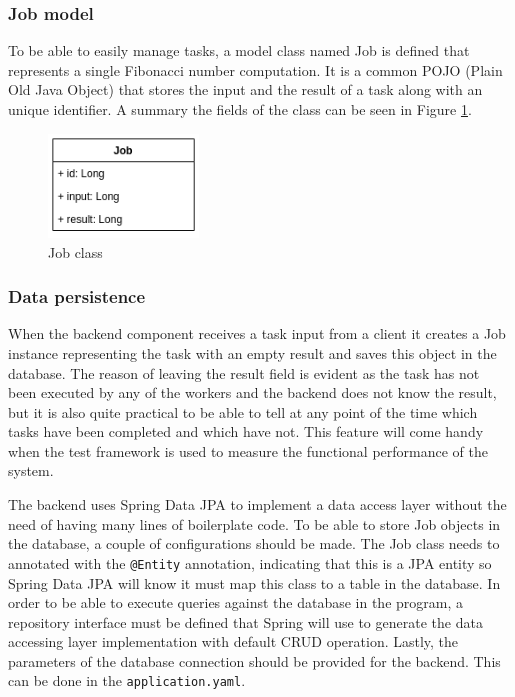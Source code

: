 \subsubsection{Job model}


To be able to easily manage tasks, a model class named Job is defined that represents a single Fibonacci number computation. It is a common POJO (Plain Old Java Object) that stores the input and the result of a task along with an unique identifier. A summary the fields of the class can be seen in Figure \ref{fig:job_model}.

\begin{figure}[h]
	\centering
	\includegraphics[width=40mm, keepaspectratio]{figures/job_class.png}
	\caption{Job class}
	\label{fig:job_model}
\end{figure}

\subsubsection{Data persistence}

When the backend component receives a task input from a client it creates a Job instance representing the task with an empty result and saves this object in the database. The reason of leaving the result field is evident as the task has not been executed by any of the workers and the backend does not know the result, but it is also quite practical to be able to tell at any point of the time which tasks have been completed and which have not. This feature will come handy when the test framework is used to measure the functional performance of the system.

The backend uses Spring Data JPA \cite{SpringDataJPA} to implement a data access layer without the need of having many lines of boilerplate code. To be able to store Job objects in the database, a couple of configurations should be made. The Job class needs to annotated with the \texttt{@Entity} annotation, indicating that this is a JPA entity so Spring Data JPA will know it must map this class to a table in the database. In order to be able to execute queries against the database in the program, a repository interface must be defined that Spring will use to generate the data accessing layer implementation with default CRUD operation. Lastly, the parameters of the database connection should be provided for the backend. This can be done in the \texttt{application.yaml}.

